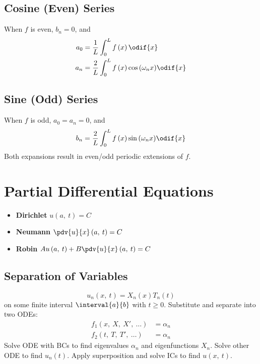 \documentclass{article}
\begin{document}
\begin{multicols*}{3}
    \subsection{Cosine (Even) Series}
    When \(f\) is even, \(b_n = 0\), and
    \begin{align*}
        a_0 & = \frac{1}{L} \int_0^L f\left( x \right) \odif{x}                                 \\
        a_n & = \frac{2}{L} \int_0^L f\left( x \right) \cos{\left( \omega_n x \right)} \odif{x}
    \end{align*}
    \subsection{Sine (Odd) Series}
    When \(f\) is odd, \(a_0 = a_n = 0\), and
    \begin{equation*}
        b_n = \frac{2}{L} \int_0^L f\left( x \right) \sin{\left( \omega_n x \right)} \odif{x}
    \end{equation*}
    Both expansions result in even/odd periodic extensions of \(f\).
    \section{Partial Differential Equations}
    \begin{itemize}
        \item \textbf{Dirichlet} \(u\left( a,\: t \right) = C\)
        \item \textbf{Neumann} \(\pdv{u}{x} \left( a,\: t \right) = C\)
        \item \textbf{Robin} \(A u\left( a,\: t \right) + B \pdv{u}{x} \left( a,\: t \right) = C\)
    \end{itemize}
    \subsection{Separation of Variables}
    \begin{equation*}
        u_n\left( x,\: t \right) = X_n\left( x \right) T_n\left( t \right)
    \end{equation*}
    on some finite interval \(\interval{a}{b}\) with \(t \geqslant 0\).
    Substitute and separate into two ODEs:
    \begin{align*}
        f_1\left( x,\: X,\: X',\: \dots \right) & = \alpha_n \\
        f_2\left( t,\: T,\: T',\: \dots \right) & = \alpha_n
    \end{align*}
    Solve ODE with BCs to find eigenvalues \(\alpha_n\) and eigenfunctions \(X_n\).
    Solve other ODE to find \(u_n\left( t \right)\).
    Apply superposition and solve ICs to find \(u\left( x,\: t \right)\).


\end{multicols*}
\end{document}
